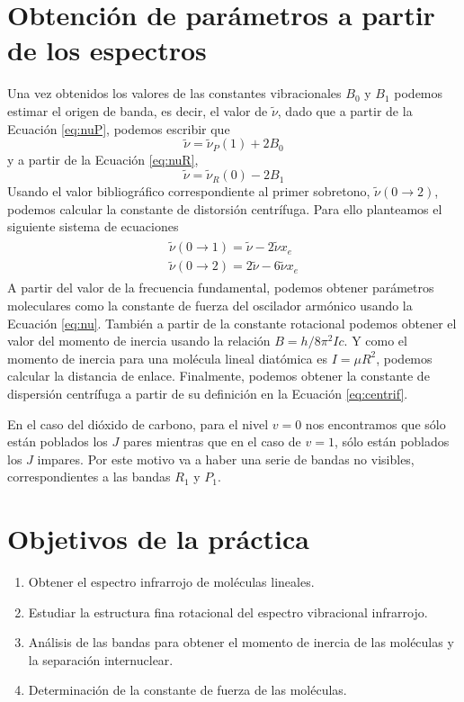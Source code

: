 \documentclass{tufte-handout}
\begin{document}
\section{Obtención de parámetros a partir de los espectros}
Una vez obtenidos los valores de las constantes
vibracionales $B_0$ y $B_1$ podemos estimar el origen de banda,
es decir, el valor de $\tilde{\nu}$, dado que a partir de la 
Ecuación \ref{eq:nuP}, podemos escribir que
\begin{equation}
    \tilde{\nu} = \tilde{\nu}_P(1) + 2B_0 
\end{equation}
y a partir de la Ecuación \ref{eq:nuR},
\begin{equation}
    \tilde{\nu} = \tilde{\nu}_R(0) - 2B_1 
\end{equation}
Usando el valor bibliográfico correspondiente al primer sobretono,
$\tilde{\nu}(0\rightarrow 2)$, podemos calcular la constante de 
distorsión centrífuga. Para ello planteamos el siguiente
sistema de ecuaciones
\begin{align}
\begin{split}
\tilde{\nu}(0\rightarrow 1) = \tilde{\nu} - 2\tilde{\nu}x_e\\
\tilde{\nu}(0\rightarrow 2) = 2\tilde{\nu} - 6\tilde{\nu}x_e
\end{split}
\end{align}
A partir del valor de la frecuencia fundamental, podemos
obtener parámetros moleculares como la constante de fuerza
del oscilador armónico usando la Ecuación \ref{eq:nu}.
También a partir de la constante rotacional podemos obtener
el valor del momento de inercia usando la relación 
$B=h/8\pi^2Ic$. Y como el momento de inercia para una molécula
lineal diatómica es $I=\mu R^2$, podemos calcular la 
distancia de enlace. Finalmente, podemos obtener la
constante de dispersión centrífuga a partir de su definición
en la Ecuación \ref{eq:centrif}.

En el caso del dióxido de carbono, para el nivel $v=0$ nos
encontramos que sólo están poblados los $J$
pares mientras que en el caso de $v=1$, sólo están poblados los
$J$ impares. Por este motivo va a haber una serie de bandas no
visibles, correspondientes a las bandas $R_1$ y $P_1$.

\section{Objetivos de la práctica}
\begin{enumerate}
\item Obtener el espectro infrarrojo de moléculas lineales.
\item Estudiar la estructura fina rotacional del espectro vibracional infrarrojo.
\item Análisis de las bandas para obtener el momento de inercia de las moléculas y la separación internuclear.
\item Determinación de la constante de fuerza de las moléculas.
\end{enumerate}
\end{document}

